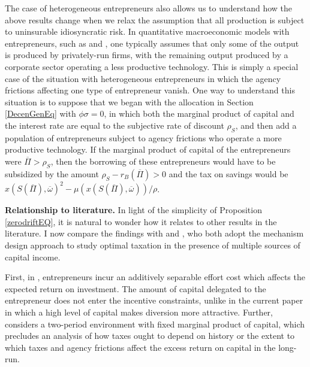 \documentclass[11pt]{article}
\theoremstyle{plain}
\theoremstyle{definition} %
\begin{document}
The case of heterogeneous entrepreneurs also allows us to understand how the above results change when we relax the assumption that all production is subject to uninsurable idiosyncratic risk. In quantitative macroeconomic models with entrepreneurs, such as \cite{quadrini_entrepreneurship_2000} and \cite{cagetti_entrepreneurship_2006}, one typically assumes that only some of the output is produced by privately-run firms, with the remaining output produced by a corporate sector operating a less productive technology. This is simply a special case of the situation with heterogeneous entrepreneurs in which the agency frictions affecting one type of entrepreneur vanish. One way to understand this situation is to suppose that we began with the allocation in Section \ref{DecenGenEq} with $\phi \sigma = 0$, in which both the marginal product of capital and the interest rate are equal to the subjective rate of discount $\rho_S$, and then add a population of entrepreneurs subject to agency frictions who operate a more productive technology. If the marginal product of capital of the entrepreneurs were $\overline{\Pi} > \rho_S$, then the borrowing of these entrepreneurs would have to be subsidized by the amount $\rho_S - r_B(\overline{\Pi}) > 0$ and the tax on savings would be $x(S(\overline{\Pi}), \overline{\omega})^2 - \mu(x(S(\overline{\Pi}), \overline{\omega}))/\rho$. 

\textbf{Relationship to literature.} In light of the simplicity of Proposition \ref{zerodriftEQ}, it is natural to wonder how it relates to other results in the literature. I now compare the findings with \cite{albanesi_optimal_2006} and \cite{shourideh_optimal_2013}, who both adopt the mechanism design approach to study optimal taxation in the presence of multiple sources of capital income. 

First, in \cite{albanesi_optimal_2006}, entrepreneurs incur an additively separable effort cost which affects the expected return on investment. The amount of capital delegated to the entrepreneur does not enter the incentive constraints, unlike in the current paper in which a high level of capital makes diversion more attractive. Further, \cite{albanesi_optimal_2006} considers a two-period environment with fixed marginal product of capital, which precludes an analysis of how taxes ought to depend on history or the extent to which taxes and agency frictions affect the excess return on capital in the long-run. 
\end{document}
